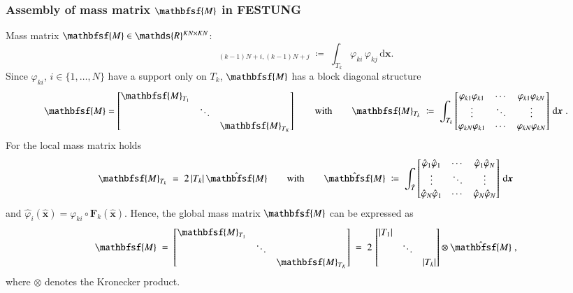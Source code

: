 \documentclass[final,12pt]{beamer}
\newcommand{\IR}{\ensuremath\mathds{R}}
\newcommand*{\vphi}{\varphi}                                     %
\renewcommand*{\vec}[1]{{\boldsymbol{#1}}}                       %
\newcommand*{\vecc}[1]{\mathbfsf{#1}}                            %
\newcommand*{\dd}{\mathrm{d}}                                    %
\begin{document}
\begin{frame}
\frametitle{Assembly of mass matrix \(\vecc{M}\) in FESTUNG}
  Mass matrix $\vecc{M}\in\IR^{KN\times KN}$:
  \begin{equation*}
    [\vecc{M}]_{(k-1)N+i,(k-1)N+j} \;\coloneqq\; \int_{T_k} \vphi_{ki} \, \vphi_{kj} \, \dd\vec{x}.
  \end{equation*}
  Since $\vphi_{ki}$, $i\in\{1,\ldots,N\}$ have a support only on $T_k$, $\vecc{M}$ has a block diagonal structure
  \begin{equation*}
    \vecc{M} = \begin{bmatrix} \vecc{M}_{T_1} & & \\ & \ddots & \\ & & \vecc{M}_{T_K} \end{bmatrix}
    \qquad\text{with}\qquad
    \vecc{M}_{T_k} \;\coloneqq\; \int_{T_k} \begin{bmatrix}
    \vphi_{k1}\vphi_{k1} & \cdots & \vphi_{k1}\vphi_{kN} \\
    \vdots               & \ddots & \vdots               \\
    \vphi_{kN}\vphi_{k1} & \cdots & \vphi_{kN}\vphi_{kN}
    \end{bmatrix}\,\dd\vec{x}\;.
  \end{equation*}
  For the local mass matrix holds
  \begin{equation*}
    \vecc{M}_{T_k} \;=\; 2\,|T_k|\,\hat{\vecc{M}}
    \qquad\text{with}\qquad
    \hat{\vecc{M}} \;\coloneqq\; \int_{\hat{T}} \begin{bmatrix}
    \hat{\vphi}_{1}\hat{\vphi}_{1} & \cdots & \hat{\vphi}_{1}\hat{\vphi}_{N} \\
    \vdots                         & \ddots & \vdots                         \\
    \hat{\vphi}_{N}\hat{\vphi}_{1} & \cdots & \hat{\vphi}_{N}\hat{\vphi}_{N}
    \end{bmatrix}\,\dd\vec{x}
  \end{equation*}
  and $\hat{\vphi}_i(\hat{\vec{x}}) = \vphi_{ki} \circ \vec{F}_k (\hat{\vec{x}})$.
  Hence, the global mass matrix $\vecc{M}$ can be expressed as
  \begin{equation*}
    \vecc{M} \;=\;
    \begin{bmatrix} \vecc{M}_{T_1} & & \\ & \ddots & \\ & & \vecc{M}_{T_K} \end{bmatrix}
    \; = \; 2 \, \begin{bmatrix} |T_1| & & \\ & \ddots & \\ & & |T_k| \end{bmatrix}
    \otimes \hat{\vecc{M}}\;,
  \end{equation*}
  where $\otimes$ denotes the Kronecker product.
\end{frame}
\end{document}
